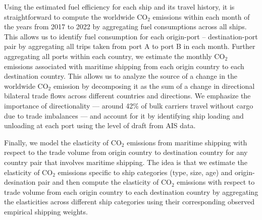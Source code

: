\documentclass[hidelinks, 12pt,letterpaper]{article}
\begin{document}
Using the estimated fuel efficiency for each ship and its travel history, it is straightforward to compute the worldwide CO$_2$ emissions within each month of the years from 2017 to 2022 by aggregating fuel consumptions across all ships. This allows us to identify fuel consumption for each origin-port -- destination-port pair
by aggregating all trips taken from port A to port B in each month. Further aggregating all ports within each country, we estimate the monthly CO$_2$ emissions associated with maritime shipping from each origin country to each destination country.
This allows us to analyze the source of a change in the worldwide CO$_2$ emission by decomposing it as the sum of a change in directional bilateral trade flows across different countries and directions. We emphasize the importance of directionality --- around 42\% of bulk carriers travel without cargo due to trade imbalances \citep{brancaccio2020geography} --- and account for it by identifying ship loading and unloading at each port using the level of draft from AIS data.


Finally, we model the elasticity of CO$_2$ emissions from maritime shipping with respect to the trade volume from origin country to destination country for any country pair that involves maritime shipping. The idea is that we estimate  the elasticity of CO$_2$ emissions specific to ship categories (type, size, age) and origin-desination pair and then compute the elasticity of CO$_2$ emissions with respect to trade volume from each origin country to each destination country by aggregating the elasticities across different ship categories using their corresponding observed empirical shipping weights.
\end{document}
